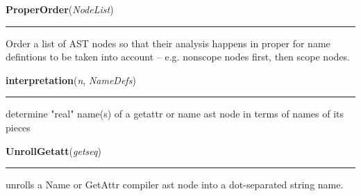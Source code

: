     \label{System:StaticAnalysis:ProperOrder}

    \vspace{0.5ex}

\hspace{.8\funcindent}\begin{boxedminipage}{\funcwidth}

    \raggedright \textbf{ProperOrder}(\textit{NodeList})

    \vspace{-1.5ex}

    \rule{\textwidth}{0.5\fboxrule}
\setlength{\parskip}{2ex}
    Order a list of AST nodes so that their analysis happens in proper for 
    name defintions to be taken into account -- e.g. nonscope nodes first, 
    then scope nodes.

\setlength{\parskip}{1ex}
    \end{boxedminipage}

    \label{System:StaticAnalysis:interpretation}

    \vspace{0.5ex}

\hspace{.8\funcindent}\begin{boxedminipage}{\funcwidth}

    \raggedright \textbf{interpretation}(\textit{n}, \textit{NameDefs})

    \vspace{-1.5ex}

    \rule{\textwidth}{0.5\fboxrule}
\setlength{\parskip}{2ex}
    determine "real" name(s) of a getattr or name ast node in terms of 
    names of its pieces

\setlength{\parskip}{1ex}
    \end{boxedminipage}

    \label{System:StaticAnalysis:UnrollGetatt}

    \vspace{0.5ex}

\hspace{.8\funcindent}\begin{boxedminipage}{\funcwidth}

    \raggedright \textbf{UnrollGetatt}(\textit{getseq})

    \vspace{-1.5ex}

    \rule{\textwidth}{0.5\fboxrule}
\setlength{\parskip}{2ex}
    unrolls a Name or GetAttr compiler ast node into a dot-separated string
    name.

\setlength{\parskip}{1ex}
    \end{boxedminipage}

